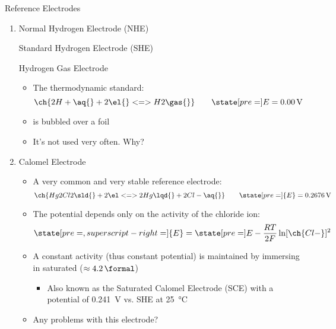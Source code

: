 \documentclass[notes=show]{beamer}
\begin{document}
\begin{frame}[allowframebreaks]{Reference Electrodes}
	\begin{enumerate}
		\item Normal Hydrogen Electrode (NHE)
			
			Standard Hydrogen Electrode (SHE)
				
			Hydrogen Gas Electrode


			\begin{itemize}
				\item The thermodynamic standard:
					\begin{equation*}
						\ch{2 H+ \aq{} + 2 \el{} <=>
						H2\gas{}} \qquad \state[pre=]E =
						\SI{0.00}{\volt}
					\end{equation*}
				\item {} is bubbled over a 
					foil
				\item It's not used very often. Why?
			\end{itemize}

			\framebreak
			
		\item Calomel Electrode
			\begin{itemize}
				\item A very common and very stable reference
					electrode:
					\begin{equation*}
						\ch{Hg2Cl2\sld{} + 2 \el <=> 2
						Hg\lqd{} + 2 Cl- \aq{}} \qquad
						\state[pre=]{E} =
						\SI{0.2676}{\volt}
					\end{equation*}
				\item The potential depends only on the activity
					of the chloride ion:
					\begin{equation*}
						\state[pre=,superscript-right=]{E}
						= \state[pre=]E - \frac{RT}{2F}
						\ln [\ch{Cl-}]^2
					\end{equation*}
				\item A constant activity (thus constant
					potential) is maintained by immersing in
					saturated  ($\approx
					\SI{4.2}{\formal}$)
					\begin{itemize}
						\item Also known as the
							\alert{Saturated Calomel
							Electrode (SCE)} with a
							potential of
							\SI{0.241}{\volt} vs.
							SHE at
							\SI{25}{\celsius}
					\end{itemize}
				\item Any problems with this electrode?
			\end{itemize}


\end{enumerate}
\end{frame}
\end{document}
